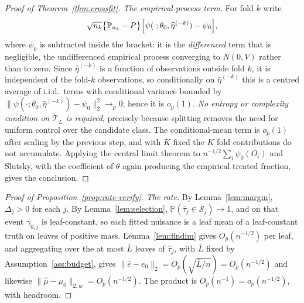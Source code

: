 \documentclass[11pt]{article}
\theoremstyle{plain}
\theoremstyle{definition}
\theoremstyle{remark}
\newcommand{\PP}{\mathbb{P}}
\newcommand{\cT}{\mathcal{T}}
\newcommand{\cS}{\mathcal{S}}
\newcommand{\ez}{e_0}
\newcommand{\mz}{\mu_0}
\newcommand{\ehat}{\widehat{e}}
\newcommand{\mhat}{\widehat{\mu}}
\newcommand{\that}{\widehat{\tau}}
\newcommand{\Ltwo}[1]{\lVert #1 \rVert_{2}}
\newcommand{\Lw}[1]{\lVert #1 \rVert_{2,w}}
\begin{document}
\begin{proof}[Proof of Theorem~\ref{thm:crossfit}]
\emph{The empirical-process term.} For fold $k$ write
\[
  \sqrt{n_k}\bigl\{\mathbb{P}_{n_k}-P\bigr\}
   \Bigl[\psi(\cdot;\theta_0,\widehat\eta^{(-k)})-\psi_0\Bigr],
\]
where $\psi_0$ is subtracted inside the bracket: it is the \emph{differenced} term
that is negligible, the undifferenced empirical process converging to $N(0,V)$
rather than to zero. Since $\widehat\eta^{(-k)}$ is a function of observations
outside fold $k$, it is independent of the fold-$k$ observations, so conditionally
on $\widehat\eta^{(-k)}$ this is a centred average of i.i.d.\ terms with conditional
variance bounded by
$\lVert\psi(\cdot;\theta_0,\widehat\eta^{(-k)})-\psi_0\rVert_{2}^2\to_p0$; hence
it is $o_p(1)$. \emph{No entropy or complexity condition on $\cT_{\bar L}$ is
required}, precisely because splitting removes the need for uniform control over
the candidate class. The conditional-mean term is $o_p(1)$ after scaling by the
previous step, and with $K$ fixed the $K$ fold contributions do not accumulate.
Applying the central limit theorem to $n^{-1/2}\sum_i\psi_0(O_i)$ and Slutsky,
with the coefficient of $\theta$ again producing the empirical treated fraction,
gives the conclusion.
\end{proof}

\begin{proof}[Proof of Proposition~\ref{prop:rate-verify}]
\emph{The rate.} By Lemma~\ref{lem:margin}, $\Delta_j>0$ for each $j$. By
Lemma~\ref{lem:selection}, $\PP(\that_j\in\cS_j)\to1$, and on that event
$\gamma_{0,j}$ is leaf-constant, so each fitted nuisance is a leaf mean of a
leaf-constant truth on leaves of positive mass. Lemma~\ref{lem:findim} gives
$O_p(n^{-1/2})$ per leaf, and aggregating over the at most $\bar L$ leaves of
$\that_j$, with $\bar L$ fixed by Assumption~\ref{ass:budget}, gives
$\Ltwo{\ehat-\ez}=O_p(\sqrt{\bar L/n})=O_p(n^{-1/2})$
and likewise $\Lw{\mhat-\mz}=O_p(n^{-1/2})$. The product is
$O_p(n^{-1})=o_p(n^{-1/2})$, with headroom.
\end{proof}
\end{document}
